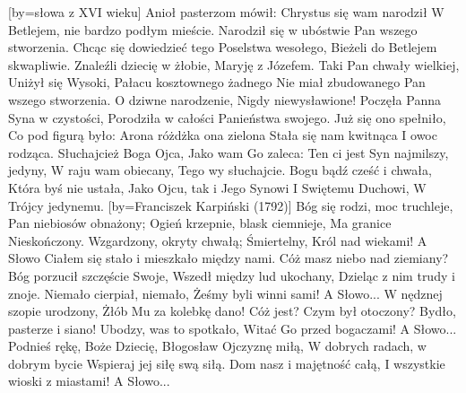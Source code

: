[by={słowa z XVI wieku}]
\beginverse
    Anioł pasterzom mówił:
    Chrystus się wam narodził
    W Betlejem, nie bardzo podłym mieście.
    Narodził się w ubóstwie
    Pan wszego stworzenia.
\endverse
\beginverse
    Chcąc się dowiedzieć tego
    Poselstwa wesołego,
    Bieżeli do Betlejem skwapliwie.
    Znaleźli dziecię w żłobie,
    Maryję z Józefem.
\endverse
\beginverse
    Taki Pan chwały wielkiej,
    Uniżył się Wysoki,
    Pałacu kosztownego żadnego
    Nie miał zbudowanego
    Pan wszego stworzenia.
\endverse
\beginverse
    O dziwne narodzenie,
    Nigdy niewysławione!
    Poczęła Panna Syna w czystości,
    Porodziła w całości
    Panieństwa swojego.
\endverse
\beginverse %
    Już się ono spełniło,
    Co pod figurą było:
    Arona różdżka ona zielona
    Stała się nam kwitnąca
    I owoc rodząca.
\endverse
\beginverse
    Słuchajcież Boga Ojca,
    Jako wam Go zaleca:
    Ten ci jest Syn najmilszy, jedyny,
    W raju wam obiecany,
    Tego wy słuchajcie.
\endverse
\beginverse
    Bogu bądź cześć i chwała,
    Która byś nie ustała,
    Jako Ojcu, tak i Jego Synowi
    I Swiętemu Duchowi,
    W Trójcy jedynemu.
\endverse
\endsong
[by={Franciszek Karpiński (1792)}]
\beginverse
    Bóg się rodzi, moc truchleje,
    Pan niebiosów obnażony;
    Ogień krzepnie, blask ciemnieje,
    Ma granice Nieskończony.
    Wzgardzony, okryty chwałą;
    Śmiertelny, Król nad wiekami!
\endverse
\beginchorus
	A Słowo Ciałem się stało
	i mieszkało między nami.
\endchorus
\beginverse
    Cóż masz niebo nad ziemiany?
    Bóg porzucił szczęście Swoje,
    Wszedł między lud ukochany,
    Dzieląc z nim trudy i znoje.
    Niemało cierpiał, niemało,
    Żeśmy byli winni sami!
\endverse
\beginchorus
	A Słowo...
\endchorus
\beginverse
    W nędznej szopie urodzony,
    Żłób Mu za kolebkę dano!
    Cóż jest? Czym był otoczony?
    Bydło, pasterze i siano!
    Ubodzy, was to spotkało,
    Witać Go przed bogaczami!
\endverse
\beginchorus
	A Słowo...
\endchorus
\beginverse
    Podnieś rękę, Boże Dziecię,
    Błogosław Ojczyznę miłą,
    W dobrych radach, w dobrym bycie
    Wspieraj jej siłę swą siłą.
    Dom nasz i majętność całą,
    I wszystkie wioski z miastami!
\endverse
\beginchorus
	A Słowo...
\endchorus
\endsong


